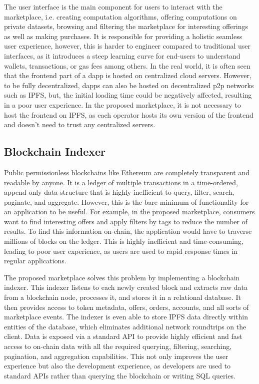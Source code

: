 The user interface is the main component for users to interact with the marketplace, i.e. creating computation algorithms, offering computations on private datasets, browsing and filtering the marketplace for interesting offerings as well as making purchases. It is responsible for providing a holistic seamless user experience, however, this is harder to engineer compared to traditional user interfaces, as it introduces a steep learning curve for end-users to understand wallets, transactions, or gas fees among others. In the real world, it is often seen that the frontend part of a \acrshort{dapp} is hosted on centralized cloud servers. However, to be fully decentralized, \acrshort{dapp}s can also be hosted on decentralized \acrshort{p2p} networks such as IPFS, but, the initial loading time could be negatively affected, resulting in a poor user experience. In the proposed marketplace, it is not necessary to host the frontend on IPFS, as each operator hosts its own version of the frontend and doesn't need to trust any centralized servers.
            
\subsection{Blockchain Indexer}
\label{subsec:indexer}

Public permissionless blockchains like Ethereum are completely transparent and readable by anyone. It is a ledger of multiple transactions in a time-ordered, append-only data structure that is highly inefficient to query, filter, search, paginate, and aggregate. However, this is the bare minimum of functionality for an application to be useful. For example, in the proposed marketplace, consumers want to find interesting offers and apply filters by tags to reduce the number of results. To find this information on-chain, the application would have to traverse millions of blocks on the ledger. This is highly inefficient and time-consuming, leading to poor user experience, as users are used to rapid response times in regular applications.

The proposed marketplace solves this problem by implementing a blockchain indexer. This indexer listens to each newly created block and extracts raw data from a blockchain node, processes it, and stores it in a relational database. It then provides access to token metadata, offers, orders, accounts, and all sorts of marketplace events. The indexer is even able to store IPFS data directly within entities of the database, which eliminates additional network roundtrips on the client. Data is exposed via a standard API to provide highly efficient and fast access to on-chain data with all the required querying, filtering, searching, pagination, and aggregation capabilities. This not only improves the user experience but also the development experience, as developers are used to standard APIs rather than querying the blockchain or writing SQL queries.

